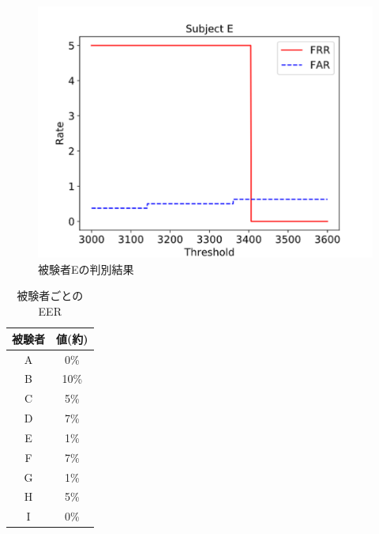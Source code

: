 \documentclass[a4j]{jarticle}%
\begin{document}
\begin{figure}[!t]
  \begin{center}
    \includegraphics[width=1\linewidth]{tex_fig/subject_E.eps}
  \end{center}
    \vspace{-8mm}
  \caption{被験者Eの判別結果}
  \label{subject_E}
\end{figure}

\begin{table}[htb]
  \center
  \begin{tabular}{|c|c|} \hline
    被験者 & 値(約) \\ \hline
    A & 0\% \\
    B & 10\% \\
    C & 5\% \\
    D & 7\% \\
    E & 1\% \\
    F & 7\% \\
    G & 1\% \\
    H & 5\% \\
    I & 0\% \\ \hline
  \end{tabular}
  \caption{被験者ごとのEER}
  \label{EER_num}
\end{table}
\end{document}
